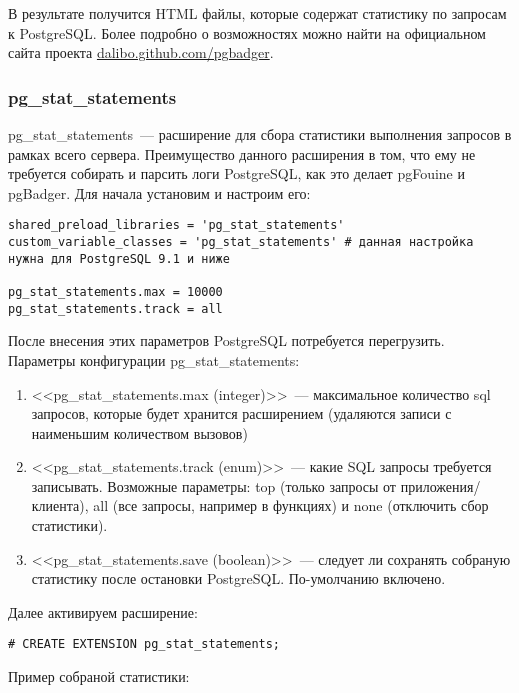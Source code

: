 В результате получится HTML файлы, которые содержат статистику по запросам к PostgreSQL. Более подробно о возможностях можно найти на официальном сайта проекта \href{http://dalibo.github.com/pgbadger/}{dalibo.github.com/pgbadger}.

\subsubsection{pg\_stat\_statements}
pg\_stat\_statements~--- расширение для сбора статистики выполнения запросов в рамках всего сервера. Преимущество данного расширения в том, что ему не требуется собирать и парсить логи PostgreSQL, как это делает pgFouine и pgBadger. Для начала установим и настроим его:

\begin{lstlisting}[label=lst:sql_performance12,caption=Настройка pg\_stat\_statements в postgresql.conf]
shared_preload_libraries = 'pg_stat_statements'
custom_variable_classes = 'pg_stat_statements' # данная настройка нужна для PostgreSQL 9.1 и ниже

pg_stat_statements.max = 10000
pg_stat_statements.track = all
\end{lstlisting}

После внесения этих параметров PostgreSQL потребуется перегрузить. Параметры конфигурации pg\_stat\_statements:

\begin{enumerate}
\item <<pg\_stat\_statements.max (integer)>>~--- максимальное количество sql запросов, которые будет хранится расширением (удаляются записи с наименьшим количеством вызовов)
\item <<pg\_stat\_statements.track (enum)>>~--- какие SQL запросы требуется записывать. Возможные параметры: top (только запросы от приложения/клиента), all (все запросы, например в функциях) и none (отключить сбор статистики).
\item <<pg\_stat\_statements.save (boolean)>>~--- следует ли сохранять собраную статистику после остановки PostgreSQL. По-умолчанию включено.
\end{enumerate}

Далее активируем расширение:

\begin{lstlisting}[label=lst:sql_performance13,caption=Активация pg\_stat\_statements]
# CREATE EXTENSION pg_stat_statements;
\end{lstlisting}

Пример собраной статистики:

